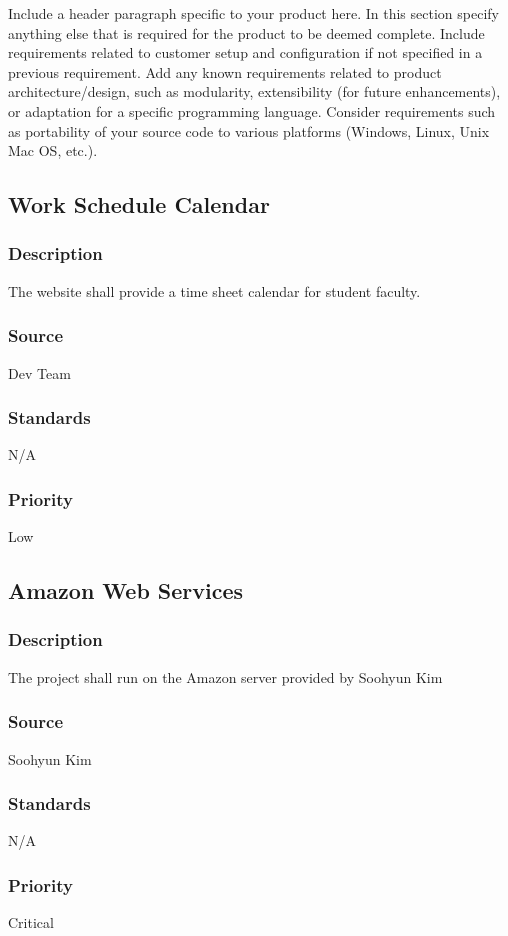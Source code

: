 Include a header paragraph specific to your product here. In this section specify anything else that is required for the product to be deemed complete. Include requirements related to customer setup and configuration if not specified in a previous requirement. Add any known requirements related to product architecture/design, such as modularity, extensibility (for future enhancements), or adaptation for a specific programming language. Consider requirements such as portability of your source code to various platforms (Windows, Linux, Unix Mac OS, etc.).

\subsection{Work Schedule Calendar}
\subsubsection{Description}
The website shall provide a time sheet calendar for student faculty.
\subsubsection{Source}
Dev Team
\subsubsection{Standards}
N/A
\subsubsection{Priority}
Low

\subsection{Amazon Web Services}
\subsubsection{Description}
The project shall run on the Amazon server provided by Soohyun Kim
\subsubsection{Source}
Soohyun Kim
\subsubsection{Standards}
N/A
\subsubsection{Priority}
Critical

